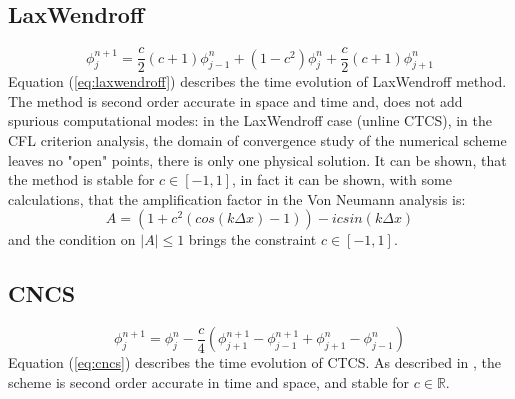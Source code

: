 \subsection{LaxWendroff}
\begin{equation}
\phi_j^{n+1}=\frac{c}{2}(c+1)\phi_{j-1}^{n}+(1-c^2)\phi_{j}^{n}+\frac{c}{2}(c+1)\phi_{j+1}^{n}
\label{eq:laxwendroff}
\end{equation}
Equation (\ref{eq:laxwendroff}) describes the time evolution of LaxWendroff method. The method is second order accurate in space and time and, does not add spurious computational modes: in the LaxWendroff case (unline CTCS), in the CFL criterion analysis, the domain of convergence study of the numerical scheme leaves no "open" points, there is only one physical solution. It can be shown, that the method is stable for $c\in[-1,1]$, in fact it can be shown, with some calculations, that the amplification factor in the Von Neumann analysis is:
\begin{equation}
\label{eq:laxwen_vonneumann}
A=(1+c^2(cos(k\Delta x)-1))-icsin(k\Delta x)
\end{equation}
and the condition on $|A|\leq1$ brings the constraint $c\in[-1,1]$.

\subsection{CNCS}
\begin{equation}
\phi_j^{n+1}=\phi_j^{n}-\frac{c}{4}(\phi_{j+1}^{n+1}-\phi_{j-1}^{n+1}+\phi_{j+1}^{n}-\phi_{j-1}^{n})
\label{eq:cncs}
\end{equation}
Equation (\ref{eq:cncs}) describes the time evolution of CTCS. As described in \cite{mpebook}, the scheme is second order accurate in time and space, and stable for $c\in\mathbb{R}$.

